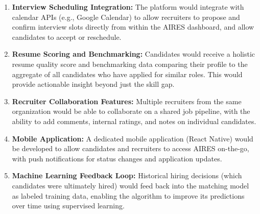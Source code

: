 \begin{enumerate}
    \item \textbf{Interview Scheduling Integration:} The platform would integrate with calendar APIs (e.g., Google Calendar) to allow recruiters to propose and confirm interview slots directly from within the AIRES dashboard, and allow candidates to accept or reschedule.
    
    \item \textbf{Resume Scoring and Benchmarking:} Candidates would receive a holistic resume quality score and benchmarking data comparing their profile to the aggregate of all candidates who have applied for similar roles. This would provide actionable insight beyond just the skill gap.
    
    \item \textbf{Recruiter Collaboration Features:} Multiple recruiters from the same organization would be able to collaborate on a shared job pipeline, with the ability to add comments, internal ratings, and notes on individual candidates.
    
    \item \textbf{Mobile Application:} A dedicated mobile application (React Native) would be developed to allow candidates and recruiters to access AIRES on-the-go, with push notifications for status changes and application updates.
    
    \item \textbf{Machine Learning Feedback Loop:} Historical hiring decisions (which candidates were ultimately hired) would feed back into the matching model as labeled training data, enabling the algorithm to improve its predictions over time using supervised learning.
\end{enumerate}

